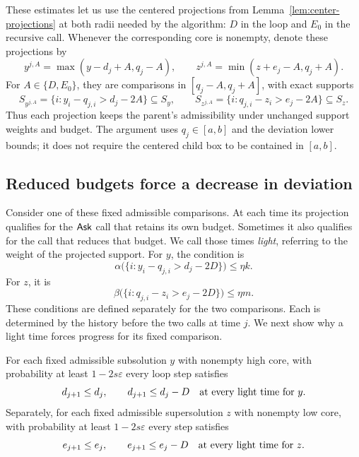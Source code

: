 These estimates let us use the centered projections from
Lemma~\ref{lem:center-projections} at both radii needed by the
algorithm: \(D\) in the loop and \(E_0\) in the recursive call.
Whenever the corresponding core is nonempty, denote these projections by
\begin{equation}
\label{ori:projected-comparisons}
  y^{j,A}=\max(y-d_j+A,q_j-A),
  \qquad
  z^{j,A}=\min(z+e_j-A,q_j+A).
\end{equation}
For \(A\in\{D,E_0\}\), they are comparisons in
\([q_j-A,q_j+A]\), with exact supports
\begin{equation}
\label{ori:projected-supports}
  S_{y^{j,A}}=\{i:y_i-q_{j,i}>d_j-2A\}\subseteq S_y,
  \qquad
  S_{z^{j,A}}=\{i:q_{j,i}-z_i>e_j-2A\}\subseteq S_z.
\end{equation}
Thus each projection keeps the parent's admissibility under unchanged
support weights and budget. The argument uses \(q_j\in[a,b]\) and
the deviation lower bounds; it does not require the centered child
box to be contained in \([a,b]\).

\subsection{Reduced budgets force a decrease in deviation}

Consider one of these fixed admissible comparisons. At each time its
projection qualifies for the \(\mathsf{Ask}\) call that retains its own
budget. Sometimes it also qualifies for the call that reduces that
budget. We call those times \emph{light}, referring to the weight of
the projected support. For \(y\), the condition is
\begin{equation}
\label{ori:bad-positive}
  \alpha\bigl(\{i:y_i-q_{j,i}>d_j-2D\}\bigr)\leq\eta k.
\end{equation}
For \(z\), it is
\begin{equation}
\label{ori:bad-negative}
  \beta\bigl(\{i:q_{j,i}-z_i>e_j-2D\}\bigr)\leq\eta m.
\end{equation}
These conditions are defined separately for the two comparisons.
Each is determined by the history before the two calls at time \(j\).
We next show why a light time forces progress for its fixed comparison.

\begin{lemma}
\label{ori:deviation-drops}
For each fixed admissible subsolution \(y\) with nonempty high core,
with probability at least \(1-2s\varepsilon\) every loop step satisfies
\[
  d_{j+1}\leq d_j,
  \qquad
  d_{j+1}\leq d_j-D\quad\hbox{at every light time for \(y\)}.
\]
Separately, for each fixed admissible supersolution \(z\) with nonempty
low core, with probability at least \(1-2s\varepsilon\) every step satisfies
\[
  e_{j+1}\leq e_j,
  \qquad
  e_{j+1}\leq e_j-D\quad\hbox{at every light time for \(z\)}.
\]
\end{lemma}

